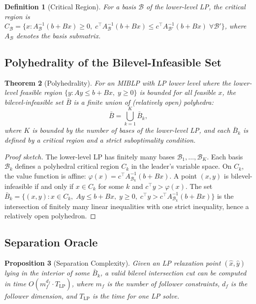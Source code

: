 \documentclass[11pt]{article}
\newtheorem{theorem}{Theorem}
\newtheorem{proposition}[theorem]{Proposition}
\newtheorem{definition}[theorem]{Definition}
\begin{document}
\begin{definition}[Critical Region]
For a basis $\mathcal{B}$ of the lower-level LP, the \emph{critical region}
is $C_{\mathcal{B}} = \{x : A_{\mathcal{B}}^{-1}(b + Bx) \geq 0,\;
c^\top A_{\mathcal{B}}^{-1}(b + Bx) \leq c^\top A_{\mathcal{B}'}^{-1}(b + Bx)
\;\forall \mathcal{B}'\}$, where $A_{\mathcal{B}}$ denotes the basis submatrix.
\end{definition}

\subsection{Polyhedrality of the Bilevel-Infeasible Set}

\begin{theorem}[Polyhedrality]
\label{thm:polyhedrality}
For an MIBLP with LP lower level where the lower-level feasible region
$\{y : Ay \leq b + Bx,\; y \geq 0\}$ is bounded for all feasible $x$,
the bilevel-infeasible set $\bar{B}$ is a finite union of
(relatively open) polyhedra:
\[
\bar{B} = \bigcup_{k=1}^{K} \bar{B}_k,
\]
where $K$ is bounded by the number of bases of the lower-level LP, and each
$\bar{B}_k$ is defined by a critical region and a strict suboptimality
condition.
\end{theorem}

\begin{proof}[Proof sketch]
The lower-level LP has finitely many bases $\mathcal{B}_1, \ldots, \mathcal{B}_K$.
Each basis $\mathcal{B}_k$ defines a polyhedral critical region $C_k$ in the
leader's variable space. On $C_k$, the value function is affine:
$\varphi(x) = c^\top A_{\mathcal{B}_k}^{-1}(b + Bx)$. A point $(x,y)$ is
bilevel-infeasible if and only if $x \in C_k$ for some $k$ and
$c^\top y > \varphi(x)$. The set $\bar{B}_k = \{(x,y) : x \in C_k,\;
Ay \leq b + Bx,\; y \geq 0,\; c^\top y > c^\top A_{\mathcal{B}_k}^{-1}(b + Bx)\}$
is the intersection of finitely many linear inequalities with one strict
inequality, hence a relatively open polyhedron.
\end{proof}

\subsection{Separation Oracle}

\begin{proposition}[Separation Complexity]
\label{prop:separation}
Given an LP relaxation point $(\hat{x}, \hat{y})$ lying in the interior
of some $\bar{B}_k$, a valid bilevel intersection cut can be computed in
time $O(m_f^{d_f} \cdot T_{\text{LP}})$, where $m_f$ is the number of
follower constraints, $d_f$ is the follower dimension, and $T_{\text{LP}}$
is the time for one LP solve.
\end{proposition}
\end{document}
